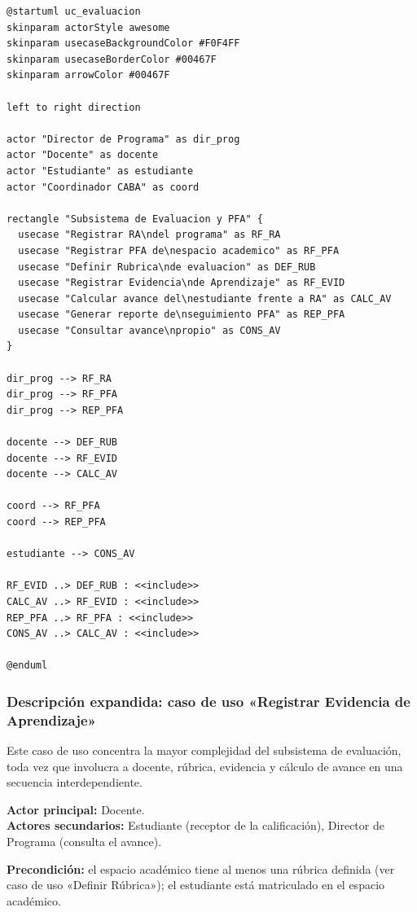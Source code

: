 \begin{lstlisting}[style=plantumlStyle,
  caption={Diagrama de casos de uso del subsistema de evaluación y -PFA-
    (PlantUML).},
  label={lst:plantuml-uc-eval}]
@startuml uc_evaluacion
skinparam actorStyle awesome
skinparam usecaseBackgroundColor #F0F4FF
skinparam usecaseBorderColor #00467F
skinparam arrowColor #00467F

left to right direction

actor "Director de Programa" as dir_prog
actor "Docente" as docente
actor "Estudiante" as estudiante
actor "Coordinador CABA" as coord

rectangle "Subsistema de Evaluacion y PFA" {
  usecase "Registrar RA\ndel programa" as RF_RA
  usecase "Registrar PFA de\nespacio academico" as RF_PFA
  usecase "Definir Rubrica\nde evaluacion" as DEF_RUB
  usecase "Registrar Evidencia\nde Aprendizaje" as RF_EVID
  usecase "Calcular avance del\nestudiante frente a RA" as CALC_AV
  usecase "Generar reporte de\nseguimiento PFA" as REP_PFA
  usecase "Consultar avance\npropio" as CONS_AV
}

dir_prog --> RF_RA
dir_prog --> RF_PFA
dir_prog --> REP_PFA

docente --> DEF_RUB
docente --> RF_EVID
docente --> CALC_AV

coord --> RF_PFA
coord --> REP_PFA

estudiante --> CONS_AV

RF_EVID ..> DEF_RUB : <<include>>
CALC_AV ..> RF_EVID : <<include>>
REP_PFA ..> RF_PFA : <<include>>
CONS_AV ..> CALC_AV : <<include>>

@enduml
\end{lstlisting}

\subsubsection*{Descripción expandida: caso de uso «Registrar Evidencia de Aprendizaje»}

Este caso de uso concentra la mayor complejidad del subsistema de evaluación,
toda vez que involucra a docente, rúbrica, evidencia y cálculo de avance en
una secuencia interdependiente.

\textbf{Actor principal:} Docente.\\
\textbf{Actores secundarios:} Estudiante (receptor de la calificación),
Director de Programa (consulta el avance).

\textbf{Precondición:} el espacio académico tiene al menos una rúbrica
definida (ver caso de uso «Definir Rúbrica»); el estudiante está matriculado
en el espacio académico.

